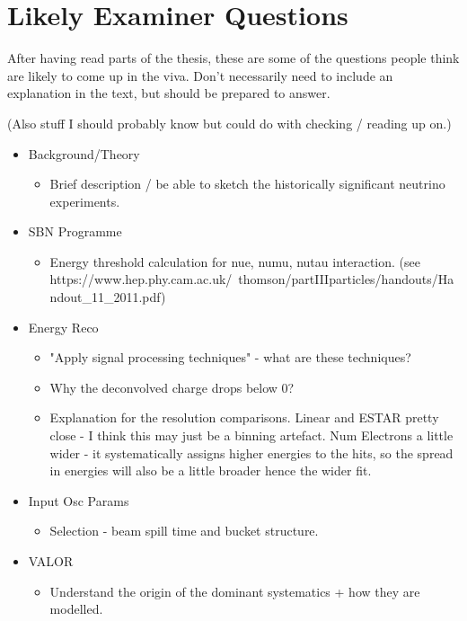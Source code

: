 \chapter{Likely Examiner Questions}\label{Likely Examiner Questions}

After having read parts of the thesis, these are some of the questions people think are likely to come up in the viva. Don't necessarily need to include an explanation in the text, but should be prepared to answer.

(Also stuff I should probably know but could do with checking / reading up on.)

\begin{itemize}
    \item Background/Theory
    \begin{itemize}
        \item Brief description / be able to sketch the historically significant neutrino experiments.
    \end{itemize}
    
    \item SBN Programme
    \begin{itemize}
        \item Energy threshold calculation for nue, numu, nutau interaction. (see https://www.hep.phy.cam.ac.uk/~thomson/partIIIparticles/handouts/Handout\_11\_2011.pdf)
    \end{itemize}
    
    \item Energy Reco
    \begin{itemize}
        \item "Apply signal processing techniques" - what are these techniques?
        \item Why the deconvolved charge drops below 0?
        \item Explanation for the resolution comparisons. Linear and ESTAR pretty close - I think this may just be a binning artefact. Num Electrons a little wider - it systematically assigns higher energies to the hits, so the spread in energies will also be a little broader hence the wider fit. 
    \end{itemize}
    
    \item Input Osc Params
    \begin{itemize}
        \item Selection - beam spill time and bucket structure.
    \end{itemize}
    
    \item VALOR
    \begin{itemize}
        \item Understand the origin of the dominant systematics + how they are modelled. 
    \end{itemize}
\end{itemize}
